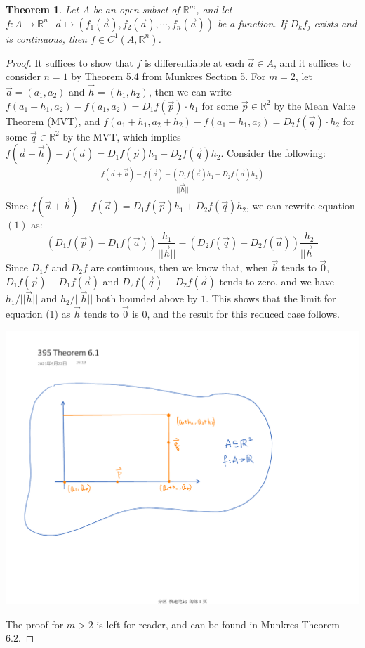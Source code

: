 \documentclass[15pt]{book}
\theoremstyle{break}
\theoremstyle{break}
\newtheorem{thm}{Theorem}[section]
\newcommand{\R}{\mathbb{R}}
\begin{document}
\hfill\break
\begin{thm}
Let $A$ be an open subset of $\R^m$, and let $f:A \to \R^n \ \ \ \vec{a}\mapsto (f_1(\vec{a}),f_2(\vec{a}),\cdots, f_n(\vec{a}))$ be a function. If $D_kf_j$ exists and is continuous, then $f \in C^1(A,\R^n)$.
\end{thm}
\begin{proof}
It suffices to show that $f$ is differentiable at each $\vec{a}\in A$, and it suffices to consider $n=1$ by Theorem 5.4 from Munkres Section 5. For $m=2$, let $\vec{a}=(a_1,a_2)$ and $\vec{h}=(h_1,h_2)$, then we can write $f(a_1+h_1,a_2)-f(a_1,a_2) = D_1f(\vec{p})\cdot h_1$ for some $\vec{p}\in \R^2$ by the Mean Value Theorem (MVT), and $f(a_1+h_1,a_2+h_2) - f(a_1+h_1,a_2) = D_2f(\vec{q})\cdot h_2$ for some $\vec{q}\in \R^2$ by the MVT, which implies $f(\vec{a}+\vec{h})-f(\vec{a}) = D_1f(\vec{p})h_1+D_2f(\vec{q})h_2$. Consider the following:
\begin{align*}
\frac{f(\vec{a}+\vec{h})-f(\vec{a})-(D_1f(\vec{a})h_1+D_2f(\vec{a})h_2)}{||\vec{h}||} \tag{1} \end{align*} 
Since $f(\vec{a}+\vec{h})-f(\vec{a}) = D_1f(\vec{p})h_1+D_2f(\vec{q})h_2$,  we can rewrite equation $(1)$ as:
$$(D_1f(\vec{p})-D_1f(\vec{a}))\frac{h_1}{||\vec{h}||} - (D_2f(\vec{q})-D_2f(\vec{a}))\frac{h_2}{||\vec{h}||}$$
Since $D_1f$ and $D_2f$ are continuous, then we know that, when $\vec{h}$ tends to $\vec{0}$, $D_1f(\vec{p})-D_1f(\vec{a})$ and $D_2f(\vec{q})-D_2f(\vec{a})$ tends to zero, and we have $h_1/||\vec{h}||$ and $h_2/||\vec{h}||$ both bounded above by $1$. This shows that the limit for equation (1) as $\vec{h}$ tends to $\vec{0}$ is $0$, and the result for this reduced case follows.
\begin{center}
\includegraphics[scale=0.5]{thm6_1.pdf}
\end{center}
The proof for $m>2$ is left for reader, and can be found in Munkres Theorem 6.2.
\end{proof}
\end{document}
